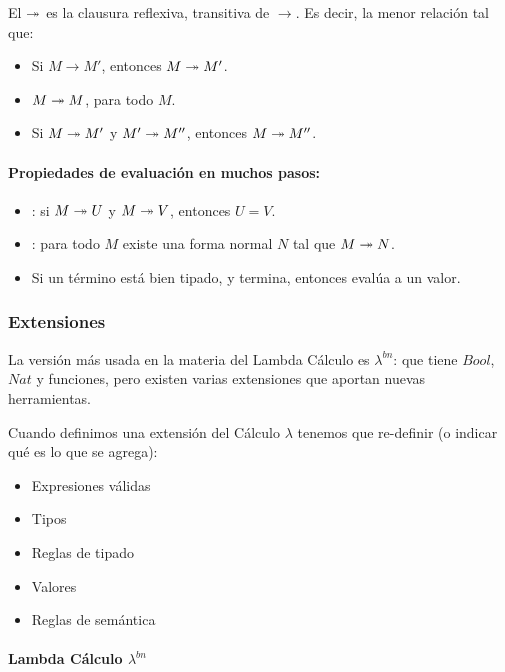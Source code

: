 \noindent
El  $\twoheadrightarrow$ es la clausura reflexiva, transitiva de $\to$. Es decir, la menor relación tal que:

\begin{itemize}
  \item Si $M\to M'$, entonces $M\twoheadrightarrow M'$.
  \item $M\twoheadrightarrow M$, para todo $M$.
  \item Si $M \twoheadrightarrow M'$ y $M' \twoheadrightarrow M''$, entonces $M \twoheadrightarrow M''$.
\end{itemize}

\paragraph{Propiedades de evaluación en muchos pasos:}

\begin{itemize}
  \item {}: si $M \twoheadrightarrow U$ y $M \twoheadrightarrow V$, entonces $U=V$.
  \item {}: para todo $M$ existe una forma normal $N$ tal que $M \twoheadrightarrow N$.
  \item Si un término está bien tipado, y termina, entonces evalúa a un valor.
\end{itemize}

\subsubsection{Extensiones}

La versión más usada en la materia del Lambda Cálculo es $\lambda^{bn}$: que tiene $Bool$, $Nat$ y funciones, pero existen varias extensiones que aportan nuevas herramientas.

Cuando definimos una extensión del Cálculo $\lambda$ tenemos que re-definir (o indicar qué es lo que se agrega):
\begin{itemize}
  \item Expresiones válidas
  \item Tipos
  \item Reglas de tipado
  \item Valores
  \item Reglas de semántica
\end{itemize}

\paragraph{Lambda Cálculo $\lambda^{bn}$}

